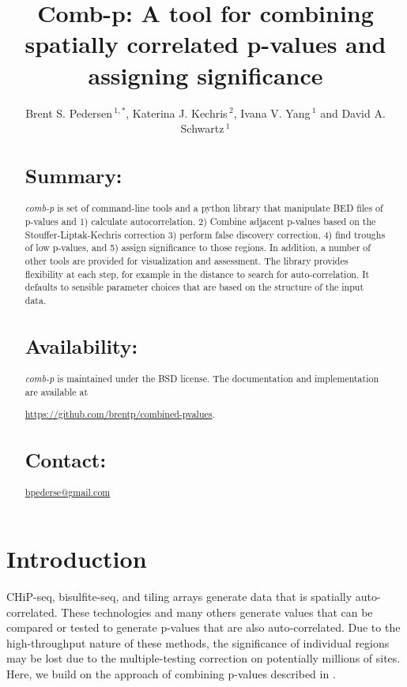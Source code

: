 \documentclass{bioinfo}
\begin{document}

\title[comb-p]{Comb-p: A tool for combining spatially correlated p-values and assigning significance}
\author[Pedersen \textit{et~al}]{Brent S. Pedersen\,$^{1,*}$, Katerina J. Kechris\,$^{2}$,
    Ivana V. Yang\,$^{1}$ and David A. Schwartz\,$^1$}
\address{$^{1}$Department of Medicine, University of Colorado, Denver, Anschutz Medical Campus, Aurora CO 80045, USA\\
$^{2}$Department of Statistics, University of Colorado, Denver, Anschutz Medical Campus, Aurora CO 80045, USA\\
}
\maketitle
\begin{abstract}

\section{Summary:}
\textit{comb-p} is set of command-line tools and a python library that
manipulate BED files of p-values and 1) calculate autocorrelation. 2) Combine
adjacent p-values based on the Stouffer-Liptak-Kechris correction \citep{Kechris2010}
3) perform false discovery correction, 4) find troughs of low p-values, and 5)
assign significance to those regions.
In addition, a number of other tools are provided for visualization and
assessment. The library provides flexibility at each
step, for example in the distance to search for auto-correlation. It defaults to
sensible parameter choices that are based on the structure of the input data.

\section{Availability:}
 \textit{comb-p} is maintained under the BSD license. The documentation and
 implementation are available at

 \href{https://github.com/brentp/combined-pvalues}{https://github.com/brentp/combined-pvalues}.
\section{Contact:} \href{bpederse@gmail.com}{bpederse@gmail.com}
\end{abstract}

\section{Introduction}
CHiP-seq, bisulfite-seq, and tiling arrays generate data that is spatially
auto-correlated. These technologies and many others generate values that can be
compared or tested to generate p-values that are also auto-correlated. Due to the
high-throughput nature of these methods, the significance of individual regions
may be lost due to the multiple-testing correction on potentially millions of sites.
Here, we build on the approach of combining p-values described in \citep{Kechris2010}.
\end{document}
